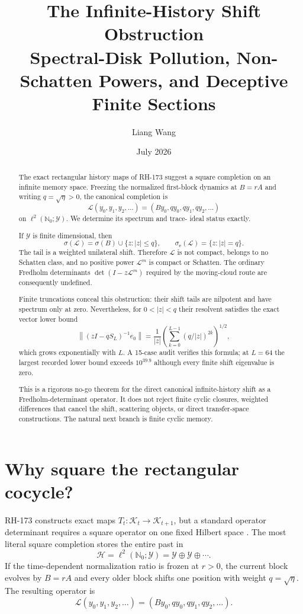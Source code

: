\documentclass[12pt]{article}
\title{The Infinite-History Shift Obstruction\\
\large Spectral-Disk Pollution, Non-Schatten Powers, and Deceptive Finite Sections}
\author{Liang Wang}
\date{July 2026}
\theoremstyle{remark}
\newcommand{\cY}{\mathcal Y}
\newcommand{\cH}{\mathcal H}
\newcommand{\cK}{\mathcal K}
\newcommand{\sigmae}{\sigma_{\mathrm e}}
\begin{document}
\maketitle

\begin{abstract}
The exact rectangular history maps of RH-173 suggest a square completion on
an infinite memory space.  Freezing the normalized first-block dynamics at
$B=rA$ and writing $q=\sqrt\eta>0$, the canonical completion is
\[
 \mathcal L(y_0,y_1,y_2,\ldots)
 =(By_0,qy_0,qy_1,qy_2,\ldots)
\]
on $\ell^2(\mathbb N_0;\mathcal Y)$.  We determine its spectrum and trace-
ideal status exactly.

If $\mathcal Y$ is finite dimensional, then
\[
 \sigma(\mathcal L)=\sigma(B)\cup\{z:|z|\le q\},
 \qquad
 \sigmae(\mathcal L)=\{z:|z|=q\}.
\]
The tail is a weighted unilateral shift.  Therefore $\mathcal L$ is not
compact, belongs to no Schatten class, and no positive power
$\mathcal L^m$ is compact or Schatten.  The ordinary Fredholm determinants
$\det(I-z\mathcal L^m)$ required by the moving-cloud route are consequently
undefined.

Finite truncations conceal this obstruction: their shift tails are nilpotent
and have spectrum only at zero.  Nevertheless, for $0<|z|<q$ their resolvent
satisfies the exact vector lower bound
\[
 \left\|(zI-qS_L)^{-1}e_0\right\|
 =\frac1{|z|}\left(\sum_{k=0}^{L-1}(q/|z|)^{2k}\right)^{1/2},
\]
which grows exponentially with $L$.  A 15-case audit verifies this formula;
at $L=64$ the largest recorded lower bound exceeds $10^{39.9}$ although every
finite shift eigenvalue is zero.

This is a rigorous no-go theorem for the direct canonical infinite-history
shift as a Fredholm-determinant operator.  It does not reject finite cyclic
closures, weighted differences that cancel the shift, scattering objects, or
direct transfer-space constructions.  The natural next branch is finite
cyclic memory.
\end{abstract}

\section{Why square the rectangular cocycle?}

RH-173 constructs exact maps $T_t:\cK_t\to\cK_{t+1}$, but a standard
operator determinant requires a square operator on one fixed Hilbert space
\citep{WangRH173}.  The most literal square completion stores the entire past
in
\[
 \cH=\ell^2(\mathbb N_0;\cY)
 =\cY\oplus\cY\oplus\cdots.
\]
If the time-dependent normalization ratio is frozen at $r>0$, the current
block evolves by $B=rA$ and every older block shifts one position with weight
$q=\sqrt\eta$.  The resulting operator is
\begin{equation}\label{eq:L}
 \mathcal L(y_0,y_1,y_2,\ldots)
 =(By_0,qy_0,qy_1,qy_2,\ldots).
\end{equation}
\end{document}
